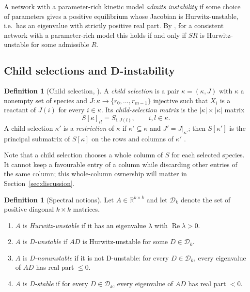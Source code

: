 \documentclass[11pt,a4paper]{article}
\theoremstyle{definition}
\newtheorem{definition}[theorem]{Definition}
\theoremstyle{remark}
\newcommand{\R}{\mathbb{R}}
\newcommand{\re}{\operatorname{Re}}
\begin{document}
A network with a parameter-rich kinetic model \emph{admits instability} \cite[Def.~2]{VassenaStadler2024} if some choice of parameters gives a positive equilibrium whose Jacobian is Hurwitz-unstable, i.e.\ has an eigenvalue with strictly positive real part. By \cite[Obs.~4]{VassenaStadler2024}, for a consistent network with a parameter-rich model this holds if and only if $SR$ is Hurwitz-unstable for some admissible $R$.

\subsection{Child selections and D-instability}

\begin{definition}[Child selection, {\cite[Def.~7]{VassenaStadler2024}}]
A \emph{child selection} is a pair $\kappa=(\kappa,J)$ with $\kappa$ a nonempty set of species and $J:\kappa\to\{r_0,\dots,r_{m-1}\}$ injective such that $X_i$ is a reactant of $J(i)$ for every $i\in\kappa$. Its \emph{child-selection matrix} is the $|\kappa|\times|\kappa|$ matrix
\[
S[\kappa]_{il}=S_{i,J(l)},\qquad i,l\in\kappa .
\]
A child selection $\kappa'$ is a \emph{restriction} of $\kappa$ if $\kappa'\subseteq\kappa$ and $J'=J|_{\kappa'}$; then $S[\kappa']$ is the principal submatrix of $S[\kappa]$ on the rows and columns of $\kappa'$ \cite[Obs.~9]{VassenaStadler2024}.
\end{definition}

Note that a child selection chooses a whole column of $S$ for each selected species. It cannot keep a favourable entry of a column while discarding other entries of the same column; this whole-column ownership will matter in Section~\ref{sec:discussion}.

\begin{definition}[Spectral notions]\label{def:spectral}
Let $A\in\R^{k\times k}$ and let $\mathcal D_k$ denote the set of positive diagonal $k\times k$ matrices.
\begin{enumerate}[label=(\alph*)]
\item $A$ is \emph{Hurwitz-unstable} if it has an eigenvalue $\lambda$ with $\re\lambda>0$.
\item $A$ is \emph{D-unstable} if $AD$ is Hurwitz-unstable for some $D\in\mathcal D_k$.
\item $A$ is \emph{D-nonunstable} if it is not D-unstable: for every $D\in\mathcal D_k$, every eigenvalue of $AD$ has real part $\le0$.
\item $A$ is \emph{D-stable} if for every $D\in\mathcal D_k$, every eigenvalue of $AD$ has real part $<0$.
\end{enumerate}
\end{definition}
\end{document}

